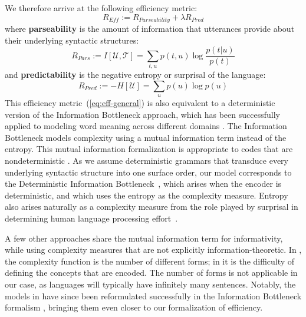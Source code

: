 \documentclass[10pt,twoside,lineno]{article}
\newcommand{\key}[1]{\textbf{#1}}
\newcommand{\utterance}{\mathcal{U}}
\newcommand{\tree}{\mathcal{T}}
\begin{document}
We therefore arrive at the following efficiency metric:
\begin{equation}\label{eq:efficiency}
	R_{\textit{Eff}} := R_{\textit{Parseability}} + \lambda R_\textit{Pred}
\end{equation}
where \key{parseability} is the amount of information that utterances provide about their underlying syntactic structures:
\begin{equation}
	R_{Pars} := I[\utterance,\tree] = \sum_{t,u} p(t,u) \log \frac{p(t|u)}{p(t)}
\end{equation}
and \key{predictability} is the negative entropy or surprisal of the language:
\begin{equation}
	R_{Pred} := - H[\utterance] = \sum_{u} p(u) \log p(u)
\end{equation}
This efficiency metric~(\ref{eq:eff-general}) is also equivalent to a deterministic version \cite{strouse2017deterministic} of the Information Bottleneck approach, which has been successfully applied to modeling word meaning across different domains \cite{zaslavsky2018efficient, zaslavsky2019semantic}.
The Information Bottleneck models complexity using a mutual information term instead of the entropy.
This mutual information formalization is appropriate to codes that are nondeterministic \cite{zaslavsky2018efficient}.
As we assume deterministic grammars that transduce every underlying syntactic structure into one surface order, our model corresponds to the Deterministic Information Bottleneck~\cite{strouse2017deterministic}, which arises when the encoder is deterministic, and which uses the entropy as the complexity measure.
Entropy also arises naturally as a complexity measure from the role played by surprisal in determining human language processing effort~\cite{hale2001probabilistic,levy2008expectation,smith2013effect}.

A few other approaches share the mutual information term for informativity, while using complexity measures that are not explicitly information-theoretic.
In \cite{regier2007color, xu2014numeral, xu2016historical}, the complexity function is the number of different forms; in \cite{kemp2012kinship} it is the difficulty of defining the concepts that are encoded.
The number of forms is not applicable in our case, as languages will typically have infinitely many sentences.
Notably, the models in \cite{regier2007color, xu2016historical} have since been reformulated successfully in the Information Bottleneck formalism \cite{zaslavsky2018efficient, zaslavsky2019semantic}, bringing them even closer to our formalization of efficiency.
\end{document}

